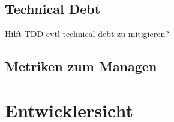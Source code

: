 \documentclass[12pt,DIV14,BCOR10mm,a4paper,twoside,parskip=half-,headsepline,headinclude,english,ngerman,bibliography=totocnumbered]{scrreprt}
\begin{document}
\subsection{Technical Debt}

Hilft TDD evtl technical debt zu mitigieren?

\subsection{Metriken zum Managen}

\section{Entwicklersicht}

\printbibliography

\printacronyms[title=Abkürzungsverzeichnis,toctitle=Abkürzungsverzeichnis]
\printglossary[type=main]

\listoffigures      %

\end{document}
